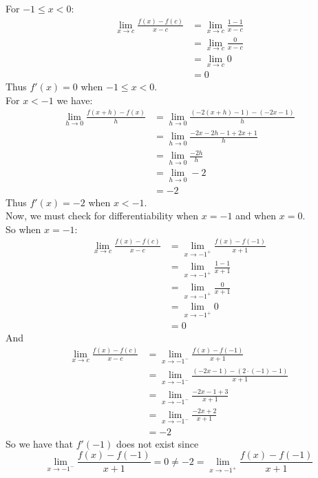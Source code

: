 \documentclass[12pt,letterpaper]{article}
\theoremstyle{case}
\theoremstyle{definition}
\begin{document}
\begin{enumerate}
\begin{enumerate}
			For $-1 \leq x < 0$:
			\begin{align*}
				\lim\limits_{x \to c} \frac{f(x)-f(c)}{x-c} &= \lim\limits_{x \to c} \frac{1-1}{x-c} \\
				&= \lim\limits_{x \to c} \frac{0}{x-c} \\
				&= \lim\limits_{x \to c} 0 \\
				&= 0
			\end{align*}
			Thus $f'(x)=0$ when $-1 \leq x < 0$.\\
			
			For $x < -1$ we have:
			\begin{align*}
				\lim\limits_{h \to 0} \frac{f(x+h)-f(x)}{h} &= \lim\limits_{h \to 0} \frac{(-2(x+h)-1)-(-2x-1)}{h} \\
				&= \lim\limits_{h \to 0} \frac{-2x-2h-1+2x+1}{h} \\
				&= \lim\limits_{h \to 0} \frac{-2h}{h} \\
				&= \lim\limits_{h \to 0} -2 \\
				&= -2
			\end{align*}
			Thus $f'(x)=-2$ when $x < -1$.\\
			
			Now, we must check for differentiability when $x=-1$ and when $x=0$.\\
			
			So when $x=-1$:
			\begin{align*}
				\lim\limits_{x \to c} \frac{f(x)-f(c)}{x-c} &= \lim\limits_{x \to -1^+} \frac{f(x)-f(-1)}{x+1} \\
				&= \lim\limits_{x \to -1^+} \frac{1-1}{x+1} \\
				&= \lim\limits_{x \to -1^+} \frac{0}{x+1} \\
				&= \lim\limits_{x \to -1^+} 0 \\
				&= 0
			\end{align*}
			And
			\begin{align*}
				\lim\limits_{x \to c} \frac{f(x)-f(c)}{x-c} &= \lim\limits_{x \to -1^-} \frac{f(x)-f(-1)}{x+1} \\
				&= \lim\limits_{x \to -1^-} \frac{(-2x-1)-(2 \cdot (-1)-1)}{x+1} \\
				&= \lim\limits_{x \to -1^-} \frac{-2x-1+3}{x+1} \\
				&= \lim\limits_{x \to -1^-} \frac{-2x+2}{x+1} \\
				&= -2
			\end{align*}
			So we have that $f'(-1)$ does not exist since 
			\[\lim\limits_{x \to -1^-} \frac{f(x)-f(-1)}{x+1}=0 \neq -2 = \lim\limits_{x \to -1^+} \frac{f(x)-f(-1)}{x+1}\]
			

\end{enumerate}
\end{enumerate}
\end{document}

